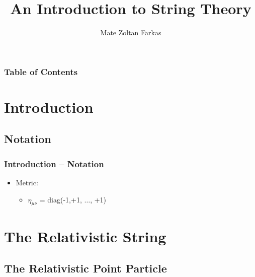 \documentclass[aspectratio=169]{beamer}
\begin{document}
	
	\author{Mate Zoltan Farkas}
	\title{An Introduction to String Theory}
	
	\begin{frame}[plain]
		\maketitle
	\end{frame}
	
	\begin{frame}
		\frametitle{Table of Contents}
		\tableofcontents
	\end{frame}

	\section{Introduction}
	\subsection{Notation}
	
	\begin{frame}
		\frametitle{Introduction -- Notation}
		\begin{itemize}
			\item Metric:
			\begin{itemize}
				\item $\eta_{\mu\nu}$ = diag(-1,+1, $\dots$, +1)
			\end{itemize}
		\end{itemize}
	\end{frame}

	\section{The Relativistic String}
	\subsection{The Relativistic Point Particle}
	
\end{document}
